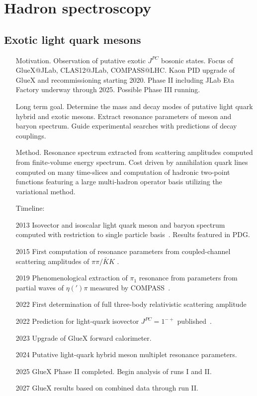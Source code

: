 \documentclass[prd,showpacs,showkeys,preprintnumbers,floatfix,
nofootinbib%
]{revtex4-2}
\begin{document}
\section{Hadron spectroscopy}\label{sec:hadspec}

\subsection{Exotic light quark mesons}
\begin{itemize}
    \item[Motivation.] Observation of putative exotic $J^{PC}$ bosonic
      states. Focus of GlueX@JLab, CLAS12@JLab, COMPASS@LHC. Kaon PID upgrade of GlueX and recommissioning starting 2020. Phase II including JLab Eta Factory underway through 2025. Possible Phase III running.
    \item[Long term goal.] Determine the mass and decay modes of
      putative light quark hybrid and exotic mesons. Extract resonance
      parameters of meson and baryon spectrum. Guide experimental
      searches with predictions of decay couplings.
    \item[Method.] Resonance spectrum extracted from scattering
      amplitudes computed from finite-volume energy spectrum. Cost
      driven by annihilation quark lines computed on many
      time-slices and computation of hadronic two-point functions
      featuring a large multi-hadron operator basis utilizing the variational method. 
\item[Timeline:]
    \item[2013] Isovector and isoscalar light quark meson and baryon
      spectrum computed with restriction to single particle basis~\cite{Dudek:2013yja}. Results featured in PDG.
    \item[2015] First computation of resonance parameters from coupled-channel scattering
      amplitudes of $\pi\pi/\bar{K}K$ \cite{Wilson:2015dqa}.
    \item[2019] Phenomenological extraction of $\pi_1$ resonance from 
      parameters from partial waves of $\eta(')\pi$ measured by COMPASS~\cite{JPAC:2018zyd}.
    \item[2022] First determination of full three-body relativistic scattering amplitude~\cite{Hansen:2020otl}
    \item[2022] Prediction for light-quark isovector $J^{PC}=1^{-+}$ published~\cite{Woss:2020ayi}.
    \item[2023] Upgrade of GlueX forward calorimeter.
    \item[2024] Putative light-quark hybrid meson multiplet resonance parameters.
    \item[2025] GlueX Phase II completed. Begin analysis of runs I and II. 
    \item[2027] GlueX results based on combined data through run II.
\end{itemize}
\end{document}
